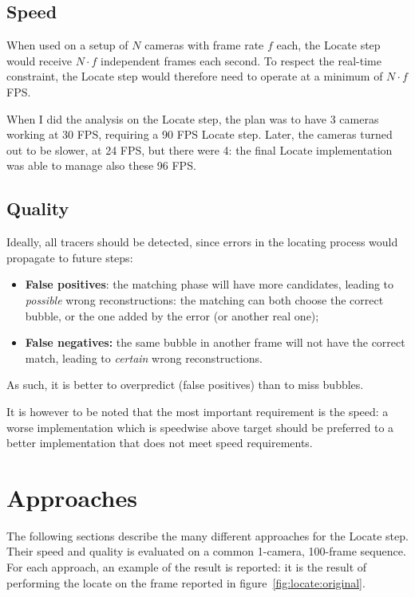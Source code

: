 \subsection{Speed}

When used on a setup of $N$ cameras with frame rate $f$ each, the Locate step would receive $N{\cdot}f$ independent frames each second.
To respect the real-time constraint, the Locate step would therefore need to operate at a minimum of $N{\cdot}f$ FPS.

When I did the analysis on the Locate step, the plan was to have 3 cameras working at 30 FPS, requiring a 90 FPS Locate step.
Later, the cameras turned out to be slower, at 24 FPS, but there were 4: the final Locate implementation was able to manage also these 96 FPS.

\subsection{Quality}

Ideally, all tracers should be detected, since errors in the locating process would propagate to future steps:
\begin{itemize}
	\itemsep 0em
	\item \textbf{False positives}: the matching phase will have more candidates, leading to \textit{possible} wrong reconstructions: the matching can both choose the correct bubble, or the one added by the error (or another real one);
	\item \textbf{False negatives:} the same bubble in another frame will not have the correct match, leading to \textit{certain} wrong reconstructions.
\end{itemize}
As such, it is better to overpredict (false positives) than to miss bubbles.

It is however to be noted that the most important requirement is the speed: a worse implementation which is speedwise above target should be preferred to a better implementation that does not meet speed requirements.

\section{Approaches}

The following sections describe the many different approaches for the Locate step.
Their speed and quality is evaluated on a common 1-camera, 100-frame sequence.
For each approach, an example of the result is reported: it is the result of performing the locate on the frame reported in figure~\ref{fig:locate:original}.

